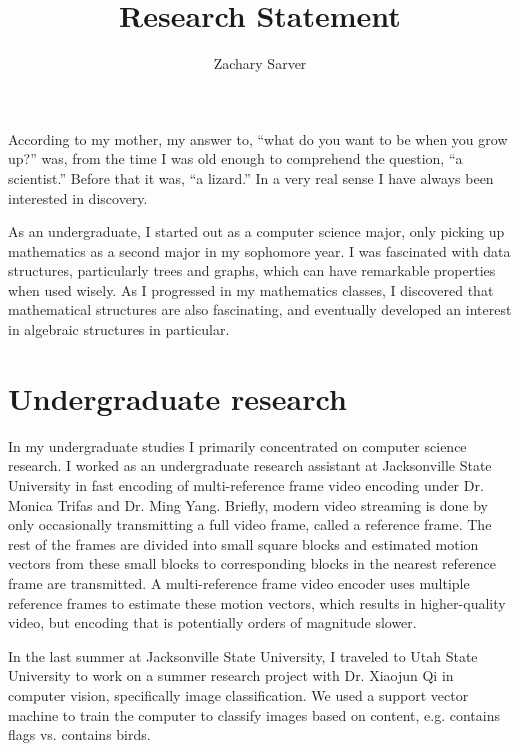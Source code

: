 \documentclass[11pt]{article}
\begin{document}
\fancyhf{}
\lhead[\thepage / \pageref{LastPage}]{Zachary Sarver}


\title{Research Statement}
\author{Zachary Sarver}
\date{}
\maketitle

According to my mother, my answer to, ``what do you want to be when you grow
up?'' was, from the time I was old enough to comprehend the question, ``a
scientist.'' Before that it was, ``a lizard.'' In a very real sense I have
always been interested in discovery. 

As an undergraduate, I started out as a computer science major, only picking up
mathematics as a second major in my sophomore year. I was fascinated with data
structures, particularly trees and graphs, which can have remarkable properties
when used wisely. As I progressed in my mathematics classes, I discovered that
mathematical structures are also fascinating, and eventually developed an
interest in algebraic structures in particular.

\section{Undergraduate research}

In my undergraduate studies I primarily concentrated on computer science
research. I worked as an undergraduate research assistant at Jacksonville State
University in fast encoding of multi-reference frame video encoding under
Dr. Monica Trifas and Dr. Ming Yang. Briefly, modern video streaming is done by
only occasionally transmitting a full video frame, called a reference frame. The
rest of the frames are divided into small square blocks and estimated motion
vectors from these small blocks to corresponding blocks in the nearest reference
frame are transmitted. A multi-reference frame video encoder uses multiple
reference frames to estimate these motion vectors, which results in
higher-quality video, but encoding that is potentially orders of magnitude
slower.

In the last summer at Jacksonville State University, I traveled to Utah State
University to work on a summer research project with Dr. Xiaojun Qi in computer
vision, specifically image classification. We used a support vector machine to
train the computer to classify images based on content, e.g. contains flags
vs. contains birds.
\end{document}
